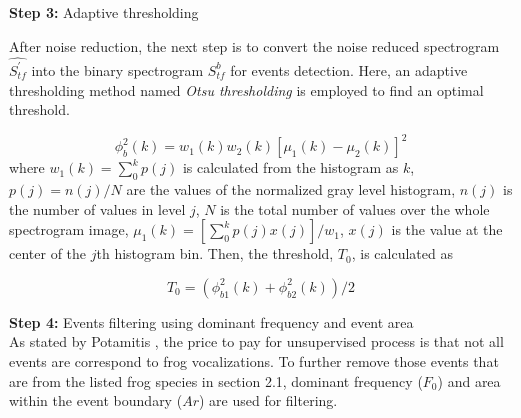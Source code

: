 \noindent \textbf{Step 3:} Adaptive thresholding

\noindent After noise reduction, the next step is to convert the noise reduced spectrogram $\hat{S^{'}_{tf}}$ into the binary spectrogram $S^{b}_{tf}$ for events detection. Here, an adaptive thresholding method named \textit{Otsu thresholding} \cite{otsu1975threshold} is employed to find an optimal threshold.

\begin{equation}
\phi_{b}^{2}(k)=w_{1}(k)w_{2}(k)[\mu_{1}(k)-\mu_{2}(k)]^{2}
\end{equation}
\noindent where $w_{1}(k)=\sum_{0}^{k}p(j)$ is calculated from the histogram as $k$, $p(j)=n(j)/N$ are the values of the normalized gray level histogram, $n(j)$ is the number of values in level $j$, $N$ is the total number of values over the whole spectrogram image, $\mu_{1}(k)=[\sum_{0}^{k}p(j)x(j)]/w_{1}$, $x(j)$ is the value at the center of the $j$th histogram bin. Then, the threshold, $T_{0}$, is calculated as

\begin{equation}
T_{0}= (\phi_{b1}^{2}(k) + \phi_{b2}^{2}(k)) / 2
\end{equation}

\noindent \textbf{Step 4:} Events filtering using dominant frequency and event area \\
As stated by Potamitis \cite{potamitis2015unsupervised}, the price to pay for unsupervised process is that not all events are correspond to frog vocalizations. To further remove those events that are from the listed frog species in section 2.1, dominant frequency ($F_{0}$) and area within the event boundary ($Ar$) are used for filtering.


